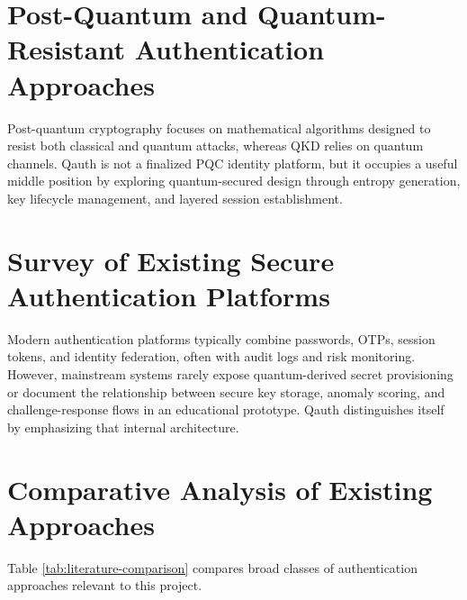 \documentclass[12pt,a4paper]{report}
\begin{document}
\section{Post-Quantum and Quantum-Resistant Authentication Approaches}
Post-quantum cryptography focuses on mathematical algorithms designed to resist both classical and quantum attacks, whereas QKD relies on quantum channels. Qauth is not a finalized PQC identity platform, but it occupies a useful middle position by exploring quantum-secured design through entropy generation, key lifecycle management, and layered session establishment.

\section{Survey of Existing Secure Authentication Platforms}
Modern authentication platforms typically combine passwords, OTPs, session tokens, and identity federation, often with audit logs and risk monitoring. However, mainstream systems rarely expose quantum-derived secret provisioning or document the relationship between secure key storage, anomaly scoring, and challenge-response flows in an educational prototype. Qauth distinguishes itself by emphasizing that internal architecture.

\section{Comparative Analysis of Existing Approaches}
Table \ref{tab:literature-comparison} compares broad classes of authentication approaches relevant to this project.
\end{document}
